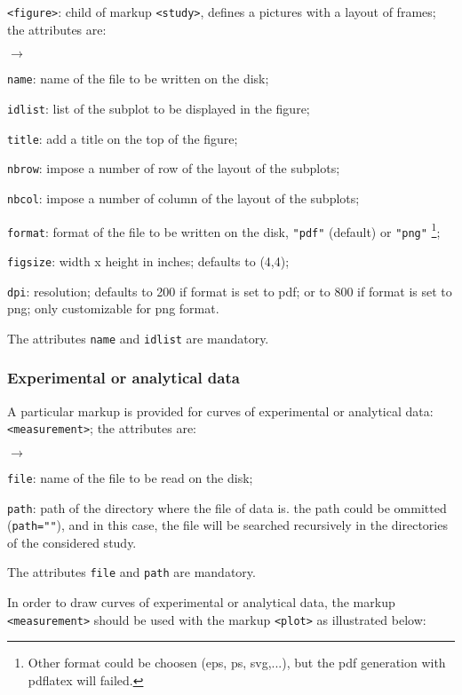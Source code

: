 \documentclass[a4paper,10pt,twoside]{csshortdoc}
\begin{document}
\texttt{<figure>}: child of markup \texttt{<study>}, defines a pictures
with a layout of frames; the attributes are:
\begin{list}{$\rightarrow$}{}
\item \texttt{name}: name of the file to be written on the disk;
\item \texttt{idlist}: list of the subplot to be displayed in the figure;
\item \texttt{title}: add a title on the top of the figure;
\item \texttt{nbrow}: impose a number of row of the layout of the subplots;
\item \texttt{nbcol}: impose a number of column of the layout of the subplots;
\item \texttt{format}: format of the file to be written on the disk,
\texttt{"pdf"} (default) or \texttt{"png"} \footnote{Other format could
be choosen (eps, ps, svg,...), but the pdf generation with pdflatex will failed.};
\item \texttt{figsize}: width x height in inches; defaults to (4,4);
\item \texttt{dpi}: resolution; defaults to 200 if format is set to pdf;
or to 800 if format is set to png; only customizable for png format.
\end{list}

The attributes \texttt{name} and \texttt{idlist} are mandatory.

\subsubsection{Experimental or analytical data}

A particular markup is provided for curves of experimental or analytical data:
\texttt{<measurement>}; the attributes are:
\begin{list}{$\rightarrow$}{}
\item \texttt{file}: name of the file to be read on the disk;
\item \texttt{path}: path of the directory where the file of data
is. the path could be ommitted (\texttt{path=""}), and in this case, the file
will be searched recursively in the directories of the considered study.
\end{list}

The attributes \texttt{file} and \texttt{path} are mandatory.

In order to draw curves of experimental or analytical data, the markup \texttt{<measurement>}
should be used with the markup \texttt{<plot>} as illustrated below:
\end{document}
